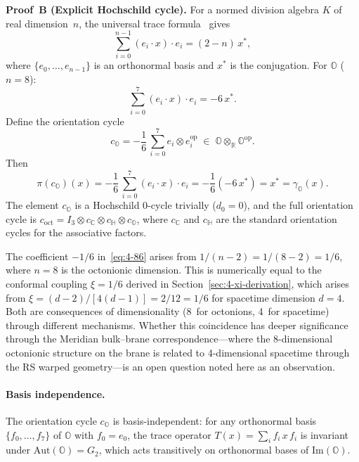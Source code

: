 \begin{theorem}
\textbf{Proof~B (Explicit Hochschild cycle).}
For a normed division algebra $K$ of real dimension~$n$, the universal trace formula~\cite{ch4:Baez2002} gives
\begin{equation}
  \sum_{i=0}^{n-1} (e_i \cdot x) \cdot e_i = (2 - n)\, x^*,
  \label{eq:4-84}
\end{equation}
where $\{e_0, \ldots, e_{n-1}\}$ is an orthonormal basis and $x^*$ is the conjugation. For $\mathbb{O}$ ($n = 8$):
\begin{equation}
  \sum_{i=0}^{7} (e_i \cdot x) \cdot e_i = -6\, x^*.
  \label{eq:4-85}
\end{equation}
Define the orientation cycle
\begin{equation}
  c_{\mathbb{O}} = -\frac{1}{6}\, \sum_{i=0}^{7} e_i \otimes e_i^{\mathrm{op}} \;\in\; \mathbb{O} \otimes_{\mathbb{R}} \mathbb{O}^{\mathrm{op}}.
  \label{eq:4-86}
\end{equation}
Then
\begin{equation}
  \pi(c_{\mathbb{O}})(x) = -\frac{1}{6}\, \sum_{i=0}^{7} (e_i \cdot x) \cdot e_i = -\frac{1}{6}(-6\, x^*) = x^* = \gamma_{\mathbb{O}}(x).
  \label{eq:4-87}
\end{equation}
The element $c_{\mathbb{O}}$ is a Hochschild 0-cycle trivially ($d_0 = 0$), and the full orientation cycle is $c_{\mathrm{oct}} = I_3 \otimes c_{\mathbb{C}} \otimes c_{\mathbb{H}} \otimes c_{\mathbb{O}}$, where $c_{\mathbb{C}}$ and $c_{\mathbb{H}}$ are the standard orientation cycles for the associative factors.
\end{theorem}

\begin{remark}
The coefficient $-1/6$ in~\eqref{eq:4-86} arises from $1/(n - 2) = 1/(8 - 2) = 1/6$, where $n = 8$ is the octonionic dimension. This is numerically equal to the conformal coupling $\xi = 1/6$ derived in Section~\ref{sec:4-xi-derivation}, which arises from $\xi = (d - 2)/[4(d - 1)] = 2/12 = 1/6$ for spacetime dimension $d = 4$. Both are consequences of dimensionality (8~for octonions, 4~for spacetime) through different mechanisms. Whether this coincidence has deeper significance through the Meridian bulk--brane correspondence---where the 8-dimensional octonionic structure on the brane is related to 4-dimensional spacetime through the RS warped geometry---is an open question noted here as an observation.
\end{remark}

\paragraph{Basis independence.}
The orientation cycle $c_{\mathbb{O}}$ is basis-independent: for any orthonormal basis $\{f_0, \ldots, f_7\}$ of $\mathbb{O}$ with $f_0 = e_0$, the trace operator $T(x) = \sum_i f_i\, x\, f_i$ is invariant under $\mathrm{Aut}(\mathbb{O}) = G_2$, which acts transitively on orthonormal bases of $\mathrm{Im}(\mathbb{O})$.


